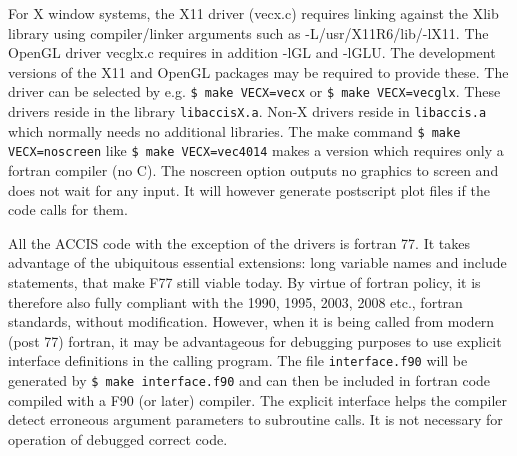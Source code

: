 \documentclass[12pt]{article}
\begin{document}
For X window systems, the X11 driver (vecx.c) requires linking against
the Xlib library using compiler/linker arguments such as
-L/usr/X11R6/lib/-lX11.  The OpenGL driver vecglx.c requires in
addition -lGL and -lGLU. The development versions of the X11 and
OpenGL packages may be required to provide these. The driver can be
selected by e.g. \verb!$ make VECX=vecx! or  \verb!$ make VECX=vecglx!. 
These drivers reside in the library \verb!libaccisX.a!.
Non-X drivers reside in \verb!libaccis.a! which normally needs no
additional libraries. 
The make command \verb!$ make VECX=noscreen!  like \verb!$ make VECX=vec4014!
makes a version which requires only a fortran
compiler (no C). The noscreen option outputs no graphics to screen and does not
wait for any input. It will however generate postscript plot files if the code
calls for them.


All the ACCIS code with the exception of the drivers is fortran 77.
It takes advantage of the ubiquitous essential extensions: long
variable names and include statements, that make F77 still viable
today.  By virtue of fortran policy, it is therefore also fully
compliant with the 1990, 1995, 2003, 2008 etc., fortran standards,
without modification. However, when it is being called from modern
(post 77) fortran, it may be advantageous for debugging purposes to
use explicit interface definitions in the calling program. The file
\verb!interface.f90! will be generated by \verb!$ make interface.f90!
and can then be included in fortran code compiled with a F90 (or
later) compiler. The explicit interface helps the compiler detect
erroneous argument parameters to subroutine calls. It is not necessary
for operation of debugged correct code.
\end{document}
